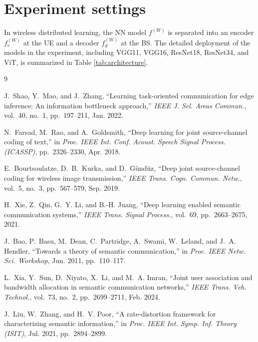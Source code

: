 \documentclass[lettersize,journal]{IEEEtran}
\theoremstyle{definition}
\theoremstyle{plain}
\begin{document}
\section{Experiment settings}
\label{sec:architecture}
In wireless distributed learning, the NN model $f^{(W)}$ is separated into an encoder $f_e^{(W)}$ at the UE and a decoder $f_d^{(W)}$ at the BS. The detailed deployment of the models in the experiment, including VGG11, VGG16, ResNet18, ResNet34, and ViT, is summarized in Table \ref{tab:architecture}.


% 
% 


\begin{thebibliography}{9}



J.~Shao, Y.~Mao, and J.~Zhang, ``Learning task-oriented communication for edge inference: An information bottleneck approach,'' \emph{IEEE J. Sel. Areas Commun.}, vol.~40, no.~1, pp.~197--211, Jan. 2022.

N.~Farsad, M.~Rao, and A.~Goldsmith, ``Deep learning for joint source-channel coding of text,'' in {\em Proc. IEEE Int. Conf. Acoust. Speech Signal Process. (ICASSP)}, pp.~2326--2330, Apr. 2018.

E.~Bourtsoulatze, D.~B.~Kurka, and D.~Gündüz, ``Deep joint source-channel coding for wireless image transmission,'' \emph{IEEE Trans. Cogn. Commun. Netw.}, vol.~5, no.~3, pp.~567--579, Sep. 2019.

H.~Xie, Z.~Qin, G.~Y. Li, and B.-H. Juang, ``Deep learning enabled semantic communication systems,'' \emph{IEEE Trans. Signal Process.}, vol.~69, pp.~2663--2675, 2021.

J.~Bao, P.~Basu, M.~Dean, C.~Partridge, A.~Swami, W.~Leland, and J.~A. Hendler, ``Towards a theory of semantic communication,'' in \emph{Proc. IEEE Netw. Sci. Workshop}, Jun. 2011, pp.~110--117.

L.~Xia, Y.~Sun, D.~Niyato, X.~Li, and M.~A. Imran, ``Joint user association and bandwidth allocation in semantic communication networks,'' \emph{IEEE Trans. Veh. Technol.}, vol.~73, no.~2, pp.~2699--2711, Feb. 2024.

J.~Liu, W.~Zhang, and H.~V. Poor, ``A rate-distortion framework for characterizing semantic information,'' in \emph{Proc. IEEE Int. Symp. Inf. Theory (ISIT)}, Jul. 2021, pp.~2894--2899.


\end{thebibliography}
\end{document}
